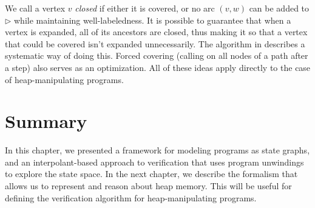 We call a vertex $v$ \textit{closed} if either it is covered, or no arc $(v,w)$ can be
added to $\rhd$ while maintaining well-labeledness. It is possible to guarantee that when
a vertex is expanded, all of its ancestors are closed, thus making it so that a vertex
that could be covered isn't expanded unnecessarily. The \unwind algorithm in
\cite{mcmillan06} describes a systematic way of doing this. Forced covering
(calling \cover on all nodes of a path after a  step) also serves as an
optimization. All of these ideas apply directly to the case of heap-manipulating programs.

\section*{Summary}
In this chapter, we presented a framework for modeling programs as state graphs, and an
interpolant-based approach to verification that uses program unwindings to explore the
state space. In the next chapter, we describe the formalism that allows us to represent
and reason about heap memory. This will be useful for defining the verification algorithm
for heap-manipulating programs.
